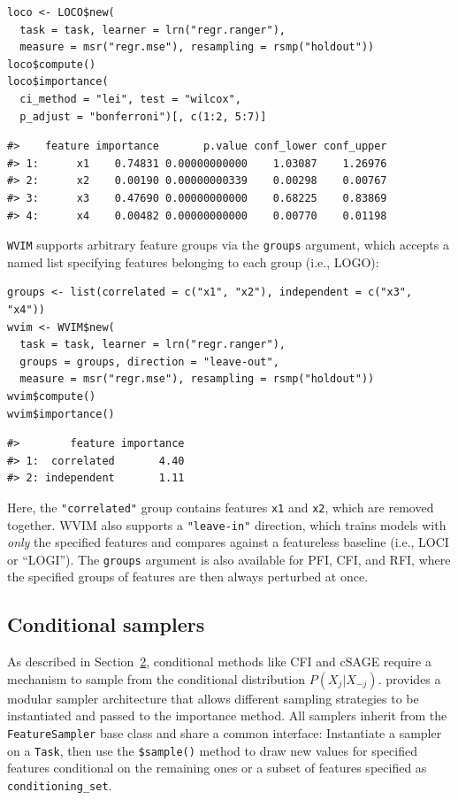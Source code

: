 \begin{verbatim}
loco <- LOCO$new(
  task = task, learner = lrn("regr.ranger"),
  measure = msr("regr.mse"), resampling = rsmp("holdout"))
loco$compute()
loco$importance(
  ci_method = "lei", test = "wilcox", 
  p_adjust = "bonferroni")[, c(1:2, 5:7)]
\end{verbatim}

\begin{verbatim}
#>    feature importance       p.value conf_lower conf_upper
#> 1:      x1    0.74831 0.00000000000    1.03087    1.26976
#> 2:      x2    0.00190 0.00000000339    0.00298    0.00767
#> 3:      x3    0.47690 0.00000000000    0.68225    0.83869
#> 4:      x4    0.00482 0.00000000000    0.00770    0.01198
\end{verbatim}

\texttt{WVIM} supports arbitrary feature groups via the \texttt{groups} argument, which accepts a named list specifying features belonging to each group (i.e., LOGO):

\begin{verbatim}
groups <- list(correlated = c("x1", "x2"), independent = c("x3", "x4"))
wvim <- WVIM$new(
  task = task, learner = lrn("regr.ranger"),
  groups = groups, direction = "leave-out",
  measure = msr("regr.mse"), resampling = rsmp("holdout"))
wvim$compute()
wvim$importance()
\end{verbatim}

\begin{verbatim}
#>        feature importance
#> 1:  correlated       4.40
#> 2: independent       1.11
\end{verbatim}

Here, the \texttt{"correlated"} group contains features \texttt{x1} and \texttt{x2}, which are removed together.
WVIM also supports a \texttt{"leave-in"} direction, which trains models with \emph{only} the specified features and compares against a featureless baseline (i.e., LOCI or ``LOGI'').
The \texttt{groups} argument is also available for PFI, CFI, and RFI, where the specified groups of features are then always perturbed at once.

\subsection{Conditional samplers}\label{conditional-samplers}

As described in Section~\hyperref[sec-fi-methods]{2}, conditional methods like CFI and cSAGE require a mechanism to sample from the conditional distribution \(P(X_j | X_{-j})\).
 provides a modular sampler architecture that allows different sampling strategies to be instantiated and passed to the importance method.
All samplers inherit from the \texttt{FeatureSampler} base class and share a common interface: Instantiate a sampler on a \texttt{Task}, then use the \texttt{\$sample()} method to draw new values for specified features conditional on the remaining ones or a subset of features specified as \texttt{conditioning\_set}.

